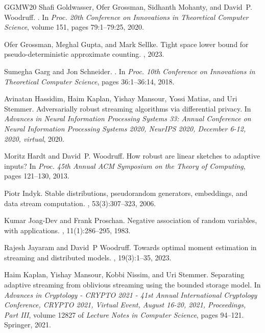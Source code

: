 \documentclass[10pt,a4paper]{article}
\theoremstyle{definition}
\theoremstyle{remark}
\begin{document}
\begin{itemize}
\begin{itemize}
\begin{thebibliography}{GGMW20}
Shafi Goldwasser, Ofer Grossman, Sidhanth Mohanty, and David~P. Woodruff.
.
\newblock In {\em Proc. 20th Conference on Innovations in Theoretical Computer
  Science}, volume 151, pages 79:1--79:25, 2020.

Ofer Grossman, Meghal Gupta, and Mark Sellke.
\newblock Tight space lower bound for pseudo-deterministic approximate
  counting.
, 2023.

Sumegha Garg and Jon Schneider.
.
\newblock In {\em Proc. 10th Conference on Innovations in Theoretical Computer
  Science}, pages 36:1--36:14, 2018.

Avinatan Hassidim, Haim Kaplan, Yishay Mansour, Yossi Matias, and Uri Stemmer.
\newblock Adversarially robust streaming algorithms via differential privacy.
\newblock In {\em Advances in Neural Information Processing Systems 33: Annual
  Conference on Neural Information Processing Systems 2020, NeurIPS 2020,
  December 6-12, 2020, virtual}, 2020.

Moritz Hardt and David~P. Woodruff.
\newblock How robust are linear sketches to adaptive inputs?
\newblock In {\em Proc. 45th Annual ACM Symposium on the Theory of Computing},
  pages 121--130, 2013.

Piotr Indyk.
\newblock Stable distributions, pseudorandom generators, embeddings, and data
  stream computation.
, 53(3):307--323, 2006.

Kumar {Joag-Dev} and Frank Proschan.
\newblock Negative association of random variables, with applications.
, 11(1):286--295, 1983.

Rajesh Jayaram and David~P Woodruff.
\newblock Towards optimal moment estimation in streaming and distributed
  models.
, 19(3):1--35, 2023.

Haim Kaplan, Yishay Mansour, Kobbi Nissim, and Uri Stemmer.
\newblock Separating adaptive streaming from oblivious streaming using the
  bounded storage model.
\newblock In {\em Advances in Cryptology - {CRYPTO} 2021 - 41st Annual
  International Cryptology Conference, {CRYPTO} 2021, Virtual Event, August
  16-20, 2021, Proceedings, Part {III}}, volume 12827 of {\em Lecture Notes in
  Computer Science}, pages 94--121. Springer, 2021.


\end{thebibliography}
\end{itemize}
\end{itemize}
\end{document}
